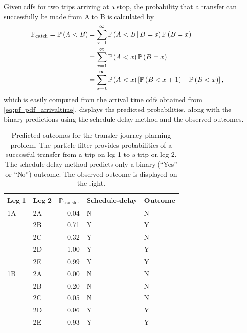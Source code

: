 Given \glspl{cdf} for two trips arriving at a stop, the probability that a transfer can successfully be made from A to B is calculated by
\begin{equation}
\label{eq:eta_total_prob}
\begin{split}
\mathbb{P}_\text{catch} =
\mathbb{P}\left(A < B\right) &= \sum_{x=1}^{\infty} \mathbb{P}\left(A < B\,|\,B = x\right)\mathbb{P}\left(B=x\right) \\
  &= \sum_{x=1}^\infty
    \mathbb{P}\left(A < x\right) \mathbb{P}\left(B=x\right) \\
  &= \sum_{x=1}^\infty
    \mathbb{P}\left(A < x\right) \left[
      \mathbb{P}\left(B < x + 1\right) - \mathbb{P}\left(B < x\right)
    \right],
\end{split}
\end{equation}
which is easily computed from the arrival time \glspl{cdf} obtained from \cref{eq:pf_pdf_arrivaltime}.  displays the predicted probabilities, along with the binary predictions using the schedule-delay method and the observed outcomes.


\begin{knitrout}\small
{}\color{fgcolor}\begin{table}

\caption[Predicted outcomes for the transfer journey planning problem. The particle filter provides probabilities of a successful transfer]{\label{tab:eta_journey_transfer_res}Predicted outcomes for the transfer journey planning problem. The particle filter provides probabilities of a successful transfer from a trip on leg 1 to a trip on leg 2. The schedule-delay method predicts only a binary (``Yes'' or ``No'') outcome. The observed outcome is displayed on the right.}
\centering
\fontsize{8}{10}\selectfont
\begin{tabular}[t]{llrll}
\toprule
Leg 1 & Leg 2 & $\mathbb{P}_\text{transfer}$ & Schedule-delay & Outcome\\
\midrule
1A & 2A & 0.04 & N & N\\
 & 2B & 0.71 & Y & Y\\
 & 2C & 0.32 & Y & N\\
 & 2D & 1.00 & Y & Y\\
 & 2E & 0.99 & Y & Y\\
\midrule
1B & 2A & 0.00 & N & N\\
 & 2B & 0.20 & N & N\\
 & 2C & 0.05 & N & N\\
 & 2D & 0.96 & Y & Y\\
 & 2E & 0.93 & Y & Y\\
\bottomrule
\end{tabular}
\end{table}


\end{knitrout}


